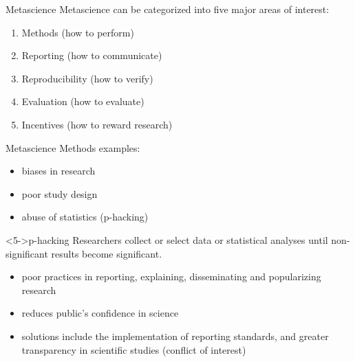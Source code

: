 \documentclass{beamer}
\begin{document}
\begin{frame}{Metascience}
	Metascience can be categorized into five major areas of interest: 
	\begin{enumerate}
		\item<2-> Methods (how to perform)
		\item<3-> Reporting (how to communicate)
		\item<4-> Reproducibility (how to verify)
		\item<5-> Evaluation (how to evaluate)
		\item<6-> Incentives (how to reward research)
	\end{enumerate}
\end{frame}

\begin{frame}{Metascience}
	Methods examples:
	\begin{itemize}
		\item<2-> biases in research
		\item<3-> poor study design
		\item<4-> abuse of statistics (p-hacking)
	\end{itemize}
	\begin{block}<5->{p-hacking}
		Researchers collect or select data or statistical analyses until non-significant results become significant.
	\end{block}

	\begin{itemize}
		\item<7-> poor practices in reporting, explaining, disseminating and popularizing research
		\item<8-> reduces public's confidence in science
		\item<9-> solutions include the implementation of reporting standards, and greater transparency in scientific studies (conflict of interest)
	\end{itemize}
\end{frame}
\end{document}
